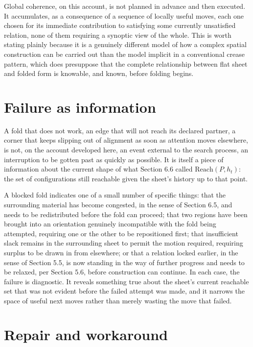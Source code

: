 \documentclass[11pt,oneside]{book}
\begin{document}
Global coherence, on this account, is not planned in advance and then
executed. It accumulates, as a consequence of a sequence of locally
useful moves, each one chosen for its immediate contribution to
satisfying some currently unsatisfied relation, none of them requiring a
synoptic view of the whole. This is worth stating plainly because it is
a genuinely different model of how a complex spatial construction can be
carried out than the model implicit in a conventional crease pattern,
which does presuppose that the complete relationship between flat sheet
and folded form is knowable, and known, before folding begins.

\hypertarget{failure-as-information}{%
\section{Failure as information}\label{failure-as-information}}

A fold that does not work, an edge that will not reach its declared
partner, a corner that keeps slipping out of alignment as soon as
attention moves elsewhere, is not, on the account developed here, an
event external to the search process, an interruption to be gotten past
as quickly as possible. It is itself a piece of information about the
current shape of what Section 6.6 called \(\text{Reach}(P, h_t)\): the
set of configurations still reachable given the sheet's history up to
that point.

A blocked fold indicates one of a small number of specific things: that
the surrounding material has become congested, in the sense of Section
6.5, and needs to be redistributed before the fold can proceed; that two
regions have been brought into an orientation genuinely incompatible
with the fold being attempted, requiring one or the other to be
repositioned first; that insufficient slack remains in the surrounding
sheet to permit the motion required, requiring surplus to be drawn in
from elsewhere; or that a relation locked earlier, in the sense of
Section 5.5, is now standing in the way of further progress and needs to
be relaxed, per Section 5.6, before construction can continue. In each
case, the failure is diagnostic. It reveals something true about the
sheet's current reachable set that was not evident before the failed
attempt was made, and it narrows the space of useful next moves rather
than merely wasting the move that failed.

\hypertarget{repair-and-workaround}{%
\section{Repair and workaround}\label{repair-and-workaround}}
\end{document}
